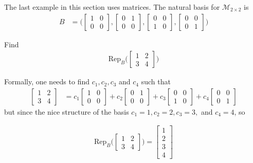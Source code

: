 The last example in this section uses matrices.  The natural basis for $\mathcal{M}_{2 \times 2}$ is
\begin{align*}
B & = \bigl( \begin{bmatrix}
1 & 0 \\ 0 & 0 
\end{bmatrix}, \begin{bmatrix}
0 & 1 \\ 0 & 0 
\end{bmatrix}, \begin{bmatrix}
0 & 0 \\ 1 & 0 
\end{bmatrix}, \begin{bmatrix}
0 & 0 \\ 0 & 1 
\end{bmatrix} \bigr) 
\end{align*}


\begin{example} \label{ex:vect:rep:matrix}
Find 
%
\begin{align*}
\text{Rep}_B \biggl(
\begin{bmatrix}
1 & 2 \\ 3 & 4 
\end{bmatrix} \biggr)
\end{align*}


\solution

Formally, one needs to find $c_1, c_2, c_3$ and $c_4$ such that
%
\begin{align*}
\begin{bmatrix}
1 & 2 \\ 3 & 4 
\end{bmatrix} & = c_1 \begin{bmatrix}
1 & 0 \\ 0 & 0 
\end{bmatrix} + c_2 \begin{bmatrix}
0 & 1 \\ 0 & 0 
\end{bmatrix} + c_3 \begin{bmatrix}
0 & 0 \\ 1 & 0 
\end{bmatrix} + c_4 \begin{bmatrix}
0 & 0 \\ 0 & 1 
\end{bmatrix}
\end{align*}
but since the nice structure of the basis $c_1=1,c_2=2,c_3=3,$ and $c_4=4$, so

\begin{align*}
\text{Rep}_B \biggl(
\begin{bmatrix}
1 & 2 \\ 3 & 4 
\end{bmatrix} \biggr) = \begin{bmatrix}
1 \\ 2 \\ 3 \\ 4
\end{bmatrix}
\end{align*}

\end{example}

